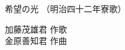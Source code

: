 \documentclass[10pt,b5j]{tarticle} %
\begin{document}
\begin{minipage}[c]{0.7\hsize} %
    \begin{center}
        {\LARGE
            希望の光 %
        }
        {\small 
            （明治四十二年寮歌） %
        }
    \end{center}
\end{minipage}
\begin{minipage}[c]{0.3\hsize} %
    \begin{flushright} %
        加藤茂雄君 作歌\\金原善知君 作曲 %
    \end{flushright}
\end{minipage}
\end{document}
